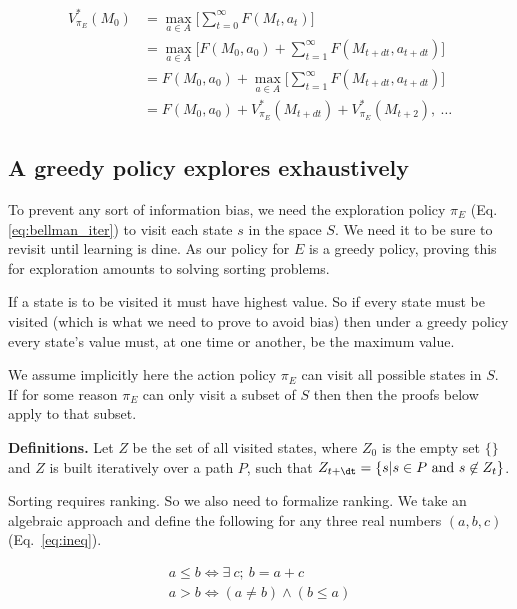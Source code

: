 \documentclass[9pt,lineno]{elife}
\begin{document}
\begin{equation}\label{eq:bellman_seq} 
	\begin{split}
		V^*_{\pi_E}(M_0) &= \max_{a \in A} \Big [\sum_{t=0}^{\infty} F(M_t, a_t)\Big ]\\
		&= \max_{a \in A} \Big [F(M_0, a_0) + \sum^{\infty}_{t=1} F(M_{t+dt}, a_{t+dt})\Big ]\\
		&= F(M_0, a_0) + \max_{a \in A} \Big [\sum_{t=1}^{\infty} F(M_{t+dt}, a_{t+dt}) \Big ]\\
		&= F(M_0, a_0) + V^*_{\pi_E}(M_{t+dt}) + V^*_{\pi_E}(M_{t+2}),\ \ldots 
	\end{split}
\end{equation}

\subsection*{A greedy policy explores exhaustively} To prevent any sort of information bias, we need the exploration policy $\pi_E$ (Eq.\ref{eq:bellman_iter}) to visit each state $s$ in the space $S$. We need it to be sure to revisit until learning is dine. As our policy for $E$ is a greedy policy, proving this for exploration amounts to solving sorting problems. 

If a state is to be visited it must have highest value. So if every state must be visited (which is what we need to prove to avoid bias) then under a greedy policy every state's value must, at one time or another, be the maximum value. 

We assume implicitly here the action policy $\pi_E$ can visit all possible states in $S$. If for some reason $\pi_E$ can only visit a subset of $S$ then then the proofs below apply to that subset.

\textbf{Definitions.} Let $Z$ be the set of all visited states, where $Z_0$ is the empty set $\{\}$ and $Z$ is built iteratively over a path $P$, such that $Z_{t+\dt} = \{s | s \in P\ \text{and}\ s \not\in Z_t\}$. 

Sorting requires ranking. So we also need to formalize ranking. We take an algebraic approach and define the following for any three real numbers $(a,b,c)$ (Eq.~\ref{eq:ineq}). 

\begin{align}\label{eq:ineq} 
	a \leq b \Leftrightarrow \exists \ c;\ b = a + c \\
	a > b \Leftrightarrow (a \neq b) \wedge (b \leq a) 
\end{align}
\end{document}
